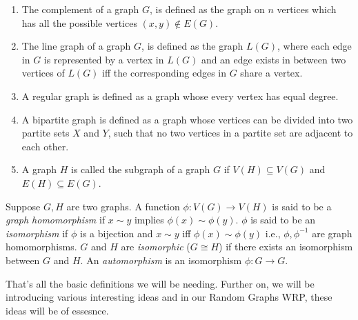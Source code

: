 \documentclass[../basic_graph_theory.tex]{subfiles}
\begin{document}
\begin{enumerate}
    \item The complement of a graph $G$, is defined as the graph on $n$ vertices which has all the possible vertices $(x,y) \notin E(G)$.
    \item The line graph of a graph $G$, is defined as the graph $L(G)$, where each edge in $G$ is represented by a vertex in $L(G)$ and an edge exists in between two vertices of $L(G)$ iff the corresponding edges in $G$ share a vertex.
    \item A regular graph is defined as a graph whose every vertex has equal degree.
    \item A bipartite graph is defined as a graph whose vertices can be divided into two partite sets $X$ and $Y$, such that no two vertices in a partite set are adjacent to each other.
    \item A graph $H$ is called the subgraph of a graph $G$ if $V(H) \subseteq V(G)$ and $E(H) \subseteq E(G)$.
\end{enumerate}

\begin{defn}
    Suppose $G,H$ are two graphs. A function $\phi : V(G) \to V(H)$ is said to be a {\em graph homomorphism} if $x \sim y$ implies $\phi(x) \sim \phi(y).$ $\phi$ is said to be an {\em isomorphism} if $\phi$ is a bijection and $x \sim y$ iff $\phi(x) \sim \phi(y)$ i.e., $\phi, \phi^{-1}$ are graph homomorphisms. $G$ and $H$ are {\em isomorphic} ($G \cong H$) if there exists an isomorphism between $G$ and $H$. An {\em  automorphism} is an isomorphism $\phi :G \to G$.
\end{defn}

That's all the basic definitions we will be needing. Further on, we will be introducing various interesting ideas and in our Random Graphs WRP, these ideas will be of essesnce.
\end{document}
